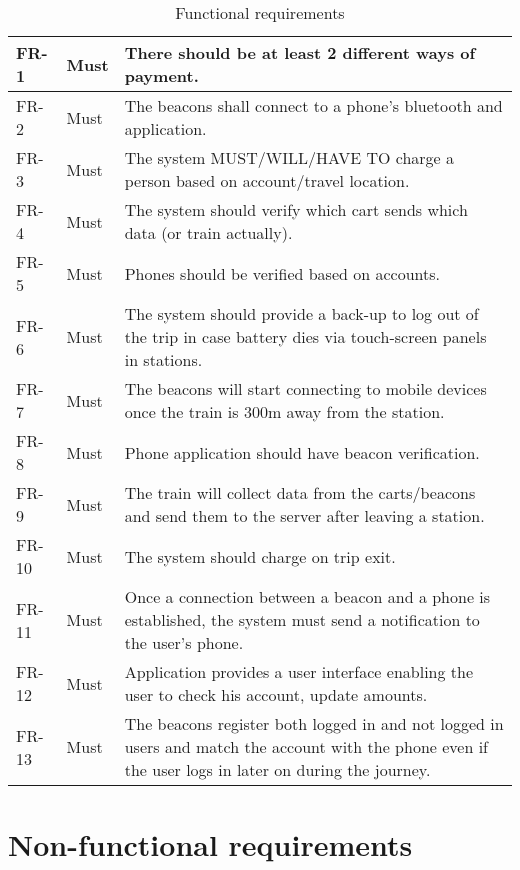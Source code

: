 {
  \renewcommand{\arraystretch}{1.5}
  \begin{table}[H]
    \centering
    \begin{tabularx}{\linewidth}{l|l|X}
     	FR-1 & Must & There should be at least 2 different ways of payment. \\ \hline
     	FR-2 & Must & The beacons shall connect to a phone's bluetooth and application.\\ \hline
     	FR-3 & Must & The system MUST/WILL/HAVE TO charge a person based on account/travel location. \\
     	\hline
     	FR-4 & Must & The system should verify which cart sends which data (or train actually). \\
     	\hline
     	FR-5 & Must & Phones should be verified based on accounts.\\ \hline        
     	FR-6 & Must & The system should provide a back-up to log out of the trip in case battery dies via touch-screen panels in stations.\\ \hline
     	FR-7 & Must & The beacons will start connecting to mobile devices once the train is 300m away from the station.\\ \hline
    	FR-8 & Must & Phone application should have beacon verification.\\	\hline
	    FR-9 & Must & The train will collect data from the carts/beacons and send them to the server  after leaving a station. \\ 	\hline
	    FR-10 & Must & The system should charge on trip exit.\\ 	\hline
    	FR-11 & Must & Once a connection between a beacon and a phone is established, the system must send a notification to the user’s phone.\\ 	\hline
	    FR-12 & Must & Application provides a user interface enabling the user to check his account, update amounts.
        \\	\hline
	    FR-13 & Must & The beacons register both logged in and not logged in users and match the account with the phone even if the user logs in later on during the journey. \\

    \end{tabularx}
    \caption{Functional requirements}
  \end{table}
}

\section{Non-functional requirements}

